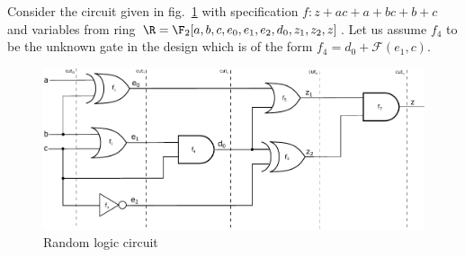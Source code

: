 \begin{Example}

Consider the circuit given in fig.~\ref{tianka_ckt_c} with specification $f:z+ac+a+bc+b+c$ and variables from ring $\R=\F_2[a,b,c,e_0,e_1,e_2,d_0,z_1,z_2,z]$. Let us assume $f_4$ to be the unknown gate in the design which is of the form $f_4 = d_0 + \mathcal{F}(e_1,c)$.\\
\begin{figure}[ht]
	\begin{center}
	\includegraphics[scale = 0.48]{tianka_ckt_c}
	\end{center}
	\vspace{-1ex}
	\caption{Random logic circuit}
	\label{tianka_ckt_c}
	\vspace{-3.5ex}
\end{figure}


\end{Example}
